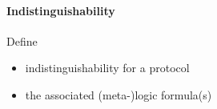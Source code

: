 \paragraph{Indistinguishability}

Define
\begin{itemize}
  \item indistinguishability for a protocol
  \item the associated (meta-)logic formula(s)
\end{itemize}

%
%
%
